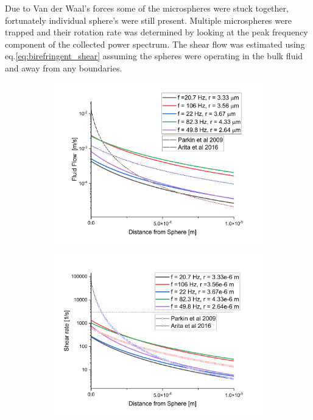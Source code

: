 Due to Van der Waal's forces some of the microspheres were stuck together, 
fortunately individual sphere's were still present. Multiple microspheres 
were trapped and their rotation rate was determined by looking at the 
peak frequency component of the collected power spectrum. The shear flow
was estimated using eq.\eqref{eq:birefringent_shear} assuming the spheres
were operating in the bulk fluid and away from any boundaries.
\begin{figure}[h!]
	\centering
	\begin{subfigure}{0.75\linewidth}
		\includegraphics[width=\linewidth]{vaterite_fluid_flow.png}
	\end{subfigure}
	\begin{subfigure}{0.75\linewidth}
		\includegraphics[width=\linewidth]{vaterite_shear_rate.png}

\end{subfigure}
\end{figure}
